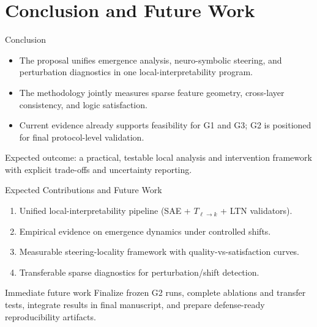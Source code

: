 \section{Conclusion and Future Work}

\begin{frame}{Conclusion}
    \begin{itemize}
        \item The proposal unifies emergence analysis, neuro-symbolic steering, and perturbation diagnostics in one local-interpretability program.
        \item The methodology jointly measures sparse feature geometry, cross-layer consistency, and logic satisfaction.
        \item Current evidence already supports feasibility for G1 and G3; G2 is positioned for final protocol-level validation.
    \end{itemize}
    \vspace{0.5em}
    \small
    Expected outcome: a practical, testable local analysis and intervention framework with explicit trade-offs and uncertainty reporting.
\end{frame}

\begin{frame}{Expected Contributions and Future Work}
    \small
    \begin{enumerate}
        \item Unified local-interpretability pipeline (SAE + $T_{\ell\to k}$ + LTN validators).
        \item Empirical evidence on emergence dynamics under controlled shifts.
        \item Measurable steering-locality framework with quality-vs-satisfaction curves.
        \item Transferable sparse diagnostics for perturbation/shift detection.
    \end{enumerate}
    \vspace{0.4em}
    \begin{block}{Immediate future work}
        Finalize frozen G2 runs, complete ablations and transfer tests, integrate results in final manuscript, and prepare defense-ready reproducibility artifacts.
    \end{block}
\end{frame}

